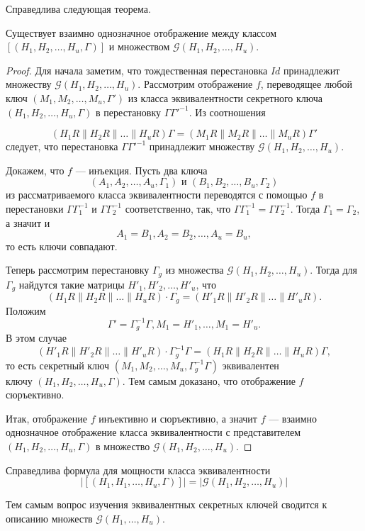Справедлива следующая теорема.
\begin{theorem}
Существует взаимно однозначное отображение между классом $[(H_1,H_2,\ldots,H_u,\Gamma)]$ и множеством
$\mathcal G(H_1,H_2,\ldots,H_u)$.
\end{theorem}
\begin{proof}
Для начала заметим, что тождественная перестановка $Id$
принадлежит множеству $\mathcal G(H_1,H_2,\ldots,H_u)$. Рассмотрим
отображение $f$, переводящее любой ключ
$(M_1,M_2,\ldots,M_u,\Gamma')$ из класса эквивалентности секретного ключа
$(H_1,H_2,\ldots,H_u,\Gamma)$ в перестановку
$\Gamma\Gamma'^{-1}.$ Из соотношения

$$(H_1R\|H_2R\|\ldots\|H_uR)\Gamma=(M_1R\|M_2R\|\ldots\|M_uR)\Gamma'$$
следует, что перестановка $\Gamma\Gamma'^{-1}$ принадлежит
множеству $\mathcal G(H_1,H_2,\ldots,H_u)$.

Докажем, что $f$
--- инъекция. Пусть два ключа $$(A_1,A_2,\ldots,A_u,\Gamma_1)
\text{ и } (B_1,B_2,\ldots,B_u,\Gamma_2)$$ из рассматриваемого
класса эквивалентности переводятся с помощью $f$ в перестановки
$\Gamma\Gamma^{-1}_1$ и $\Gamma\Gamma^{-1}_2$ соответственно, так,
что $\Gamma\Gamma^{-1}_1=\Gamma\Gamma^{-1}_2$. Тогда
$\Gamma_1=\Gamma_2$, а значит и
$$A_1=B_1, A_2=B_2,\ldots,A_u=B_u,$$ то есть ключи совпадают.

Теперь рассмотрим перестановку $\Gamma_g$ из множества
$\mathcal G(H_1,H_2,\ldots,H_u)$. Тогда для $\Gamma_g$ найдутся
такие матрицы $H'_1,H'_2,\ldots,H'_u$, что
$$(H_1R\|H_2R\|\ldots\|H_uR)\cdot
\Gamma_g=(H'_1R\|H'_2R\|\ldots\|H'_uR).$$ Положим
$$\Gamma'=\Gamma^{-1}_g\Gamma,M_1=H'_1,\ldots,M_1=H'_u.$$
В этом случае
$$(H'_1R\|H'_2R\|\ldots\|H'_uR)\cdot
\Gamma^{-1}_g\Gamma=(H_1R\|H_2R\|\ldots\|H_uR)\Gamma,$$ то есть
секретный ключ $(M_1,M_2,\ldots,M_u,\Gamma^{-1}_g\Gamma)$
эквивалентен\\ ключу $(H_1,H_2,\ldots,H_u,\Gamma)$. Тем самым
доказано, что отображение $f$ сюръективно.

Итак, отображение $f$ инъективно и сюръективно, а значит $f$ ---
взаимно однозначное отображение класса эквивалентности с
представителем $(H_1,H_2,\ldots,H_u,\Gamma)$ в множество $\mathcal
G(H_1,H_2,\ldots,H_u)$.
\end{proof}
\begin{corollary}\label{cor41}
Справедлива формула для мощности класса эквивалентности
$$|[(H_1,H_1,\ldots,H_u,\Gamma)]|=|\mathcal G(H_1,H_2,\ldots,H_u)|$$
\end{corollary}

Тем самым вопрос изучения эквивалентных секретных ключей сводится
к описанию множеств $\mathcal G(H_1,\ldots,H_u)$.

